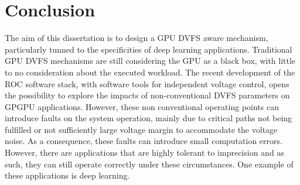 
\chapter{Conclusion}
\label{chapter:conclusion}

The aim of this dissertation is to design a GPU DVFS aware mechanism, particularly tunned to the specificities of deep learning applications. Traditional GPU DVFS mechanisms are still considering the GPU as a black box, with little to no consideration about the executed workload.
The recent development of the ROC software stack, with software tools for independent voltage control, opens the possibility to explore the impacts of non-conventional DVFS parameters on GPGPU applications. However, these non conventional operating points can introduce faults on the system operation, mainly due to critical paths not being fulfilled or not sufficiently large voltage margin to accommodate the voltage noise. As a consequence, these faults can introduce small computation errors. However, there are applications that are highly tolerant to imprecision and as such, they can still operate correctly under these circumstances. One example of these applications is deep learning.

